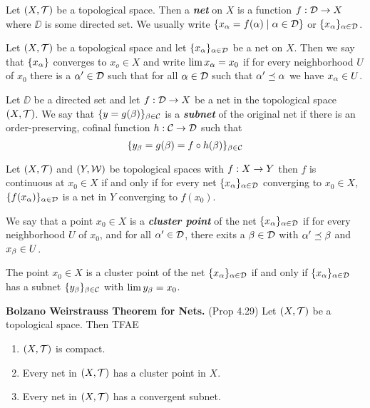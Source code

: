 \vs

\dfn Let $(X, \mathcal{T})$ be a topological space. Then a \textbf{\textit{net}} on $X$ is a function $f:\mathcal{D} \rightarrow X$ where $\DD$ is some directed set. We usually write $\{x_\alpha = f(\alpha) \mid \alpha\in \mathcal{D}\}$ or $\{x_\alpha\}_{\alpha\in \mathcal{D}}$.

\vs

\dfn Let $(X, \mathcal{T})$ be a topological space and let $\{x_\alpha\}_{\alpha\in \mathcal{D}}$ be a net on $X$. Then we say that $\{x_\alpha\}$ converges to $x_o \in X$ and write $\lim x_\alpha = x_0$ if for every neighborhood $U$ of $x_0$ there is a $\alpha^\prime\in \mathcal{D}$ such that for all $\alpha \in \mathcal{D}$ such that $\alpha^\prime \preceq \alpha$ we have $x_\alpha \in U$.

\vs

\dfn Let $\DD$ be a directed set and let $f:\mathcal{D}\rightarrow X$ be a net in the topological space $(X, \mathcal{T})$. We say that $\{y = g(\beta)\}_{\beta \in \mathcal{C}}$ is a \textit{\textbf{subnet}} of the original net if there is an order-preserving, cofinal function $h:\mathcal{C} \rightarrow \mathcal{D}$ such that 
\[\{y_\beta = g(\beta) = f\circ h(\beta)\}_{\beta \in \mathcal{C}}\]


\setcounter{thm}{18}

\begin{prop}
Let $(X, \mathcal{T})$ and $(Y, \mathcal{W})$ be topological spaces with $f:X\rightarrow Y$ then $f$ is continuous at $x_0 \in X$ if and only if for every net $\{x_\alpha\}_{\alpha\in \mathcal{D}}$ converging to $x_0\in X$, $\{f(x_\alpha)\}_{\alpha \in \mathcal{D}}$ is a net in $Y$ converging to $f(x_0)$.
\end{prop}

\vs

\dfn We say that a point $x_0\in X$ is a \textbf{\textit{cluster point}} of the net $\{x_\alpha\}_{\alpha\in \mathcal{D}}$ if for every neighborhood $U$ of $x_0$, and for all $\alpha^\prime\in \mathcal{D}$, there exits a $\beta \in \mathcal{D}$ with $\alpha^\prime\preceq \beta$ and $x_\beta \in U$.

\vs

\begin{prop}
The point $x_0 \in X$ is a cluster point of the net $\{x_\alpha\}_{\alpha \in \mathcal{D}}$ if and only if $\{x_\alpha\}_{\alpha \in \mathcal{D}}$ has a subnet $\{y_\beta\}_{\beta \in \mathcal{C}}$ with $\lim y_\beta = x_0$.
\end{prop}

\vs

\textbf{Bolzano Weirstrauss Theorem for Nets.} (Prop 4.29) Let $(X, \mathcal{T})$ be a topological space. Then TFAE
\begin{enumerate}
    \item $(X, \mathcal{T})$ is compact.
    \item Every net in $(X, \mathcal{T})$ has a cluster point in $X$.
    \item Every net in $(X, \mathcal{T})$ has a convergent subnet.
\end{enumerate}

